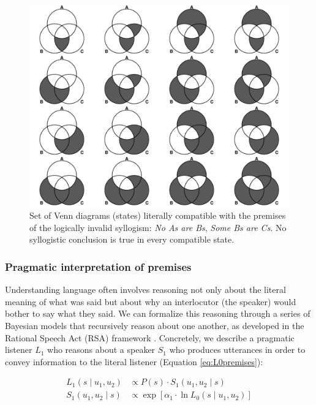 \documentclass[floatsintext, doc]{apa6}
\begin{document}
\begin{figure}[b!]
\centering
\includegraphics[width = \textwidth]{figs/diagrams_noneAB_someBC.pdf}
\caption{Set of Venn diagrams (states) literally compatible with the premises of the logically invalid syllogism: \emph{No As are Bs}, \emph{Some Bs are Cs}. No syllogistic conclusion is true in every compatible state.}
\label{fig:EIvenns}
\end{figure}


\subsubsection{Pragmatic interpretation of premises}

Understanding language often involves reasoning not only about the literal meaning of what was said but about why an interlocutor (the speaker) would bother to say what they said. 
We can formalize this reasoning through a series of Bayesian models that recursively reason about one another, as developed in the Rational Speech Act (RSA) framework \cite{Frank2012a, goodman2016pragmatic, scontras2018probabilistic}.
Concretely, we describe a pragmatic listener $L_1$ who reasons about a speaker $S_1$ who produces utterances in order to convey information to the literal listener (Equation \ref{eq:L0premises}):

\begin{align}
L_1(s \mid u_1,  u_2)& \propto  P(s)\cdot S_1(u_1, u_2 \mid s)  \label{eq:L1} \\ 
S_1(u_1, u_2 \mid s) &\propto  \exp [ \alpha_1 \cdot \ln L_0(s \mid u_1,  u_2)]  \label{eq:S1}
\end{align}
\end{document}
